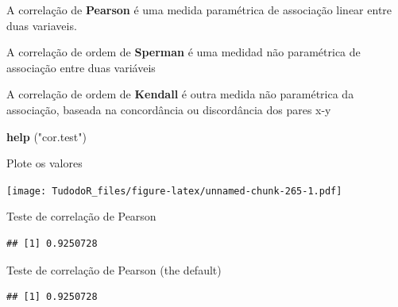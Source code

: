 \documentclass[
]{book}
\newenvironment{Shaded}{\begin{snugshade}}{\end{snugshade}}
\newcommand{\DataTypeTok}[1]{\textcolor[rgb]{0.13,0.29,0.53}{#1}}
\newcommand{\DecValTok}[1]{\textcolor[rgb]{0.00,0.00,0.81}{#1}}
\newcommand{\KeywordTok}[1]{\textcolor[rgb]{0.13,0.29,0.53}{\textbf{#1}}}
\newcommand{\NormalTok}[1]{#1}
\newcommand{\OperatorTok}[1]{\textcolor[rgb]{0.81,0.36,0.00}{\textbf{#1}}}
\newcommand{\StringTok}[1]{\textcolor[rgb]{0.31,0.60,0.02}{#1}}
\begin{document}
A correlação de \textbf{Pearson} é uma medida paramétrica de associação linear entre duas variaveis.

A correlação de ordem de \textbf{Sperman} é uma medidad não paramétrica de associação entre duas variáveis

A correlação de ordem de \textbf{Kendall} é outra medida não paramétrica da associação, baseada na concordância ou discordância dos pares x-y

\begin{Shaded}
\begin{Highlighting}[]
\KeywordTok{help}\NormalTok{ (}\StringTok{"cor.test"}\NormalTok{)}
\end{Highlighting}
\end{Shaded}

Plote os valores

\begin{Shaded}
\end{Shaded}

\texttt{[image: TudodoR\_files/figure-latex/unnamed-chunk-265-1.pdf]}

Teste de correlação de Pearson

\begin{Shaded}
\end{Shaded}

\begin{verbatim}
## [1] 0.9250728
\end{verbatim}

Teste de correlação de Pearson (the default)

\begin{Shaded}
\end{Shaded}

\begin{verbatim}
## [1] 0.9250728
\end{verbatim}
\end{document}
